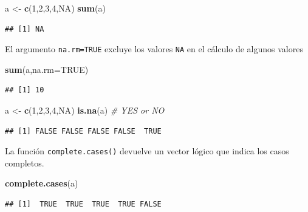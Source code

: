 \documentclass[]{book}
\newenvironment{Shaded}{\begin{snugshade}}{\end{snugshade}}
\newcommand{\KeywordTok}[1]{\textcolor[rgb]{0.13,0.29,0.53}{\textbf{#1}}}
\newcommand{\DataTypeTok}[1]{\textcolor[rgb]{0.13,0.29,0.53}{#1}}
\newcommand{\DecValTok}[1]{\textcolor[rgb]{0.00,0.00,0.81}{#1}}
\newcommand{\StringTok}[1]{\textcolor[rgb]{0.31,0.60,0.02}{#1}}
\newcommand{\CommentTok}[1]{\textcolor[rgb]{0.56,0.35,0.01}{\textit{#1}}}
\newcommand{\OtherTok}[1]{\textcolor[rgb]{0.56,0.35,0.01}{#1}}
\newcommand{\NormalTok}[1]{#1}
\begin{document}
\begin{Shaded}
\begin{Highlighting}[]
\NormalTok{a <-}\StringTok{ }\KeywordTok{c}\NormalTok{(}\DecValTok{1}\NormalTok{,}\DecValTok{2}\NormalTok{,}\DecValTok{3}\NormalTok{,}\DecValTok{4}\NormalTok{,}\OtherTok{NA}\NormalTok{)}
\KeywordTok{sum}\NormalTok{(a)}
\end{Highlighting}
\end{Shaded}

\begin{verbatim}
## [1] NA
\end{verbatim}

El argumento \texttt{na.rm=TRUE} excluye los valores \texttt{NA} en el
cálculo de algunos valores

\begin{Shaded}
\begin{Highlighting}[]
\KeywordTok{sum}\NormalTok{(a,}\DataTypeTok{na.rm=}\OtherTok{TRUE}\NormalTok{)}
\end{Highlighting}
\end{Shaded}

\begin{verbatim}
## [1] 10
\end{verbatim}

\begin{Shaded}
\begin{Highlighting}[]
\NormalTok{a <-}\StringTok{ }\KeywordTok{c}\NormalTok{(}\DecValTok{1}\NormalTok{,}\DecValTok{2}\NormalTok{,}\DecValTok{3}\NormalTok{,}\DecValTok{4}\NormalTok{,}\OtherTok{NA}\NormalTok{)}
\KeywordTok{is.na}\NormalTok{(a) }\CommentTok{# YES or NO}
\end{Highlighting}
\end{Shaded}

\begin{verbatim}
## [1] FALSE FALSE FALSE FALSE  TRUE
\end{verbatim}

La función \texttt{complete.cases()} devuelve un vector lógico que
indica los casos completos.

\begin{Shaded}
\begin{Highlighting}[]
\KeywordTok{complete.cases}\NormalTok{(a)}
\end{Highlighting}
\end{Shaded}

\begin{verbatim}
## [1]  TRUE  TRUE  TRUE  TRUE FALSE
\end{verbatim}
\end{document}
